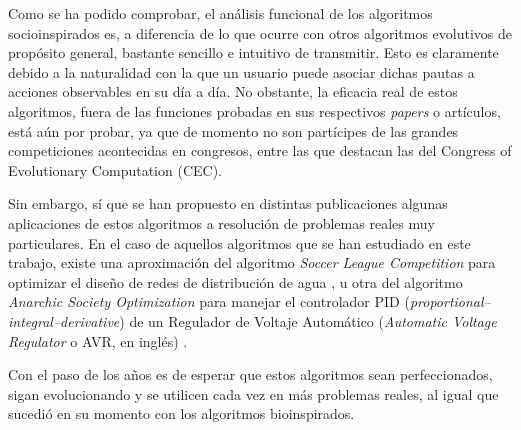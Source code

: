 Como se ha podido comprobar, el análisis funcional de los algoritmos socioinspirados es, a diferencia de lo que ocurre con otros algoritmos evolutivos de propósito general, bastante sencillo e intuitivo de transmitir. Esto es claramente debido a la naturalidad con la que un usuario puede asociar dichas pautas a acciones observables en su día a día. No obstante, la eficacia real de estos algoritmos, fuera de las funciones probadas en sus respectivos \textit{papers} o artículos, está aún por probar, ya que de momento no son partícipes de las grandes competiciones acontecidas en congresos, entre las que destacan las del Congress of Evolutionary Computation (CEC).

Sin embargo, sí que se han propuesto en distintas publicaciones algunas aplicaciones de estos algoritmos a resolución de problemas reales muy particulares. En el caso de aquellos algoritmos que se han estudiado en este trabajo, existe una aproximación del algoritmo \textit{Soccer League Competition} para optimizar el diseño de redes de distribución de agua \cite{slc-article}, u otra del algoritmo \textit{Anarchic Society Optimization} para manejar el controlador PID (\textit{proportional–integral–derivative}) de un Regulador de Voltaje Automático (\textit{Automatic Voltage Regulator} o AVR, en inglés) \cite{aso-article}.

Con el paso de los años es de esperar que estos algoritmos sean perfeccionados, sigan evolucionando y se utilicen cada vez en más problemas reales, al igual que sucedió en su momento con los algoritmos bioinspirados.
